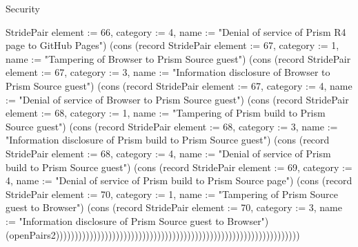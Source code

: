 \begin{lexlean}{Security}
\begin{semanticmodule}
{StridePair {element := 66, category := 4, name := "Denial of service of Prism R4 page to GitHub Pages"}) (cons (record StridePair {element := 67, category := 1, name := "Tampering of Browser to Prism Source guest"}) (cons (record StridePair {element := 67, category := 3, name := "Information disclosure of Browser to Prism Source guest"}) (cons (record StridePair {element := 67, category := 4, name := "Denial of service of Browser to Prism Source guest"}) (cons (record StridePair {element := 68, category := 1, name := "Tampering of Prism build to Prism Source guest"}) (cons (record StridePair {element := 68, category := 3, name := "Information disclosure of Prism build to Prism Source guest"}) (cons (record StridePair {element := 68, category := 4, name := "Denial of service of Prism build to Prism Source guest"}) (cons (record StridePair {element := 69, category := 4, name := "Denial of service of Prism build to Prism Source page"}) (cons (record StridePair {element := 70, category := 1, name := "Tampering of Prism Source guest to Browser"}) (cons (record StridePair {element := 70, category := 3, name := "Information disclosure of Prism Source guest to Browser"}) (openPairs2)))))))))))))))))))))))))))))))))))))))))))))))))))))))))))))))))
}


\end{semanticmodule}
\end{lexlean}
